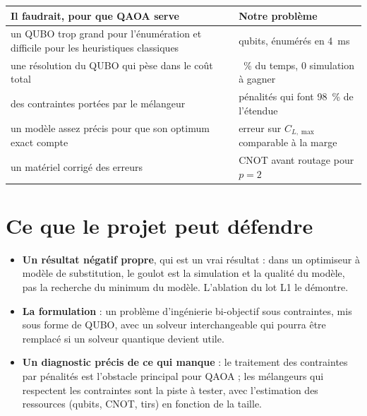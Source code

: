 \begin{center}
\renewcommand{\arraystretch}{1.2}
\begin{tabularx}{\linewidth}{>{\raggedright\arraybackslash}X>{\raggedright\arraybackslash}X}
\toprule
Il faudrait, pour que QAOA serve & Notre problème \\
\midrule
un QUBO trop grand pour l'énumération et difficile pour les heuristiques classiques & 14 qubits, énumérés en 4~ms \\
une résolution du QUBO qui pèse dans le coût total & 1~\% du temps, 0 simulation à gagner \\
des contraintes portées par le mélangeur & pénalités qui font 98~\% de l'étendue \\
un modèle assez précis pour que son optimum exact compte & erreur sur $C_{L,\max}$ comparable à la marge \\
un matériel corrigé des erreurs & 324 CNOT avant routage pour $p=2$ \\
\bottomrule
\end{tabularx}
\end{center}

\section{Ce que le projet peut défendre}
\begin{itemize}
\item \textbf{Un résultat négatif propre}, qui est un vrai résultat : dans un optimiseur à modèle de substitution, le goulot est la simulation et la qualité du modèle, pas la recherche du minimum du modèle. L'ablation du lot L1 le démontre.
\item \textbf{La formulation} : un problème d'ingénierie bi-objectif sous contraintes, mis sous forme de QUBO, avec un solveur interchangeable qui pourra être remplacé si un solveur quantique devient utile.
\item \textbf{Un diagnostic précis de ce qui manque} : le traitement des contraintes par pénalités est l'obstacle principal pour QAOA ; les mélangeurs qui respectent les contraintes sont la piste à tester, avec l'estimation des ressources (qubits, CNOT, tirs) en fonction de la taille.
\end{itemize}

